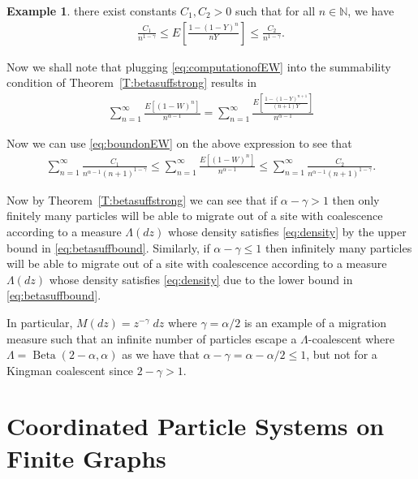 \documentclass[11pt]{article}
\theoremstyle{definition}
\newtheorem{example}{Example}
\newcommand{\N}{\mathbb{N}}
\newcommand{\Beta}{\operatorname{Beta}}
\newcommand{\thmref}[1]{Theorem~\ref{T:#1}}
\begin{document}
\begin{example}
    
    \noindent there exist constants $C_1, C_2 > 0$ such that for all $n \in \N$, we have
    \begin{align}\label{eq:boundonEW}
        \frac{C_1}{n^{1-\gamma}} \leq E\left[\frac{1-(1-Y)^n}{nY}\right] \leq \frac{C_2}{n^{1-\gamma}}.
    \end{align}

    \noindent Now we shall note that plugging \eqref{eq:computationofEW} into the summability condition of \thmref{betasuffstrong} results in
    \begin{align*}
        \sum_{n = 1}^\infty \frac{E[(1-W)^{n}]}{n^{\alpha - 1}} = \sum_{n = 1}^\infty \frac{E\left[\frac{1-(1-Y)^{n+1}}{(n+1)Y}\right]}{n^{\alpha - 1}}
    \end{align*}

    \noindent Now we can use \eqref{eq:boundonEW} on the above expression to see that
    \begin{align}\label{eq:betasuffbound}
        \sum_{n = 1}^\infty\frac{C_1}{n^{\alpha-1}(n+1)^{1-\gamma}}\leq \sum_{n = 1}^\infty \frac{E[(1-W)^{n}]}{n^{\alpha - 1}} \leq \sum_{n = 1}^\infty\frac{C_2}{n^{\alpha-1}(n+1)^{1-\gamma}}.
    \end{align}

    \noindent Now by \thmref{betasuffstrong} we can see that if $\alpha - \gamma > 1$ then only finitely many particles will be able to migrate out of a site with coalescence according to a measure $\Lambda(dz)$ whose density satisfies \eqref{eq:density} by the upper bound in \eqref{eq:betasuffbound}. Similarly, if $\alpha - \gamma \leq 1$ then infinitely many particles will be able to migrate out of a site with coalescence according to a measure $\Lambda(dz)$ whose density satisfies \eqref{eq:density} due to the lower bound in \eqref{eq:betasuffbound}.
    \medskip
    
    \noindent In particular, $M(dz) = z^{-\gamma}\;dz$ where $\gamma = \alpha/2$ is an example of a migration measure such that an infinite number of particles escape a $\Lambda$-coalescent where $\Lambda = \Beta(2-\alpha, \alpha)$ as we have that $\alpha - \gamma = \alpha - \alpha/2 \leq 1$, but not for a Kingman coalescent since $2 - \gamma > 1$.
\end{example}

\section{Coordinated Particle Systems on Finite Graphs}
\end{document}
